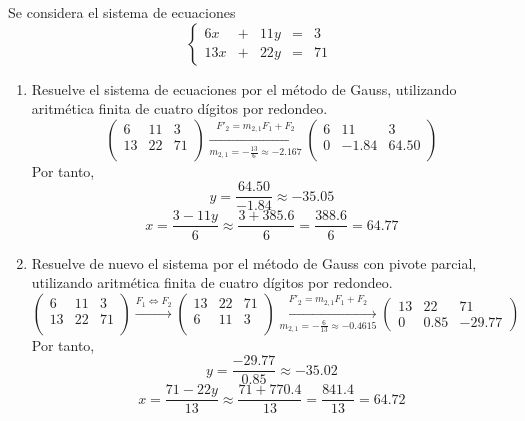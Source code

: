\begin{ejercicio}
    Se considera el sistema de ecuaciones
    $$\left\{ \begin{array}{rrrrr}
        6x & + & 11y & = & 3 \\
        13x & + & 22y & = & 71
    \end{array} \right.$$

    \begin{enumerate}
        \item Resuelve el sistema de ecuaciones por el método de Gauss, utilizando aritmética finita de cuatro dígitos por redondeo.
        \begin{equation*}
        \left(\begin{array}{cc|c}
            6 & 11 & 3\\
            13 & 22 & 71 \\
        \end{array}
        \right) \xrightarrow[m_{2,1} = -\frac{13}{6} \approx -2.167]{F'_2=m_{2,1}F_1 + F_2}
        \left(\begin{array}{cc|c}
            6 & 11 & 3\\
            0 & -1.84 & 64.50 \\
        \end{array}
        \right)
        \end{equation*}
        Por tanto,
        $$y=\frac{64.50}{-1.84} \approx -35.05$$
        $$x=\frac{3-11y}{6} \approx \frac{3+385.6}{6} = \frac{388.6}{6} = 64.77$$

        \item Resuelve de nuevo el sistema por el método de Gauss con pivote parcial, utilizando aritmética finita de cuatro dígitos por redondeo.
        \begin{equation*}
        \left(\begin{array}{cc|c}
            6 & 11 & 3\\
            13 & 22 & 71 \\
        \end{array}
        \right) \xrightarrow{F_1 \Longleftrightarrow F_2}
        \left(\begin{array}{cc|c}
            13 & 22 & 71 \\
            6 & 11 & 3\\
        \end{array}
        \right) \xrightarrow[m_{2,1} = -\frac{6}{13} \approx -0.4615]{F'_2=m_{2,1}F_1 + F_2}
        \left(\begin{array}{cc|c}
            13 & 22 & 71 \\
            0 & 0.85 & -29.77
        \end{array}
        \right)
        \end{equation*}
        Por tanto,
        $$y=\frac{-29.77}{0.85} \approx -35.02$$
        $$x=\frac{71-22y}{13} \approx \frac{71+770.4}{13} = \frac{841.4}{13} = 64.72$$
        

\end{enumerate}
\end{ejercicio}
